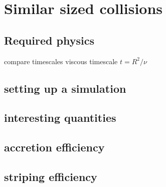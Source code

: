 \graphicspath{{./03figs/}}

\chapter{Similar sized collisions}

%

\section{Required physics}
compare timescales
viscous timescale $t = R^2 / \nu$


\section{setting up a simulation}

\section{interesting quantities}

\section{accretion efficiency}

\section{striping efficiency}




\SSC 
\textsf{\SSC}



